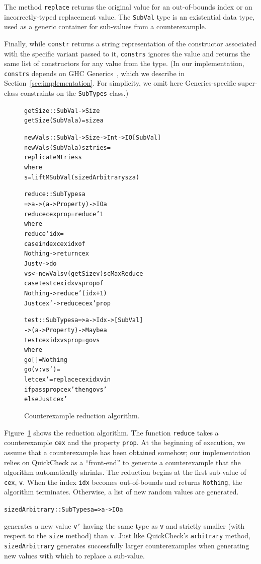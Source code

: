 \documentclass[10pt]{sigplanconf}
\newenvironment{code}{\begin{alltt}}{\end{alltt}}
\newcommand{\ttp}[1]{\texttt{#1}}
\begin{document}
The method \ttp{replace} returns the original value for an out-of-bounds index
or an incorrectly-typed replacement value.  The \ttp{SubVal} type is an
existential data type, used as a generic container for sub-values from a
counterexample.

Finally, while \ttp{constr} returns a string representation of the constructor
associated with the specific variant passed to it, \ttp{constrs} ignores the
value and returns the same list of constructors for any value from the type.
(In our implementation, \ttp{constrs} depends on GHC Generics~\cite{generics},
which we describe in Section~\ref{sec:implementation}.  For simplicity, we omit
here Generics-specific super-class constraints on the \ttp{SubTypes} class.)

\begin{figure}[ht]
  \begin{code}
getSize :: SubVal -> Size
getSize (SubVal a) = size a

newVals :: SubVal -> Size -> Int -> IO [SubVal]
newVals (SubVal a) sz tries =
  replicateM tries s
  where
  s  = liftM SubVal (sizedArbitrary sz a)

reduce :: SubTypes a
       => a -> (a -> Property) -> IO a
reduce cex prop = reduce' 1
  where
  reduce' idx =
    case index cex idx of
      Nothing -> return cex
      Just v  -> do
        vs <- newVals v (getSize v) scMaxReduce
        case test cex idx vs prop of
          Nothing   -> reduce' (idx+1)
          Just cex' -> reduce cex' prop

test :: SubTypes a => a -> Idx -> [SubVal]
     -> (a -> Property) -> Maybe a
test cex idx vs prop = go vs
  where
  go []      = Nothing
  go (v:vs') =
    let cex' = replace cex idx v in
    if pass prop cex' then go vs'
      else Just cex'
  \end{code}
  \caption{Counterexample reduction algorithm.\label{fig:reduction}}
\end{figure}

Figure~\ref{fig:reduction} shows the reduction algorithm.  The function
\ttp{reduce} takes a counterexample \ttp{cex} and the property \ttp{prop}.  At
the beginning of execution, we assume that a counterexample has been obtained
somehow; our implementation relies on QuickCheck as a ``front-end'' to generate
a counterexample that the algorithm automatically shrinks.  The reduction begins
at the first sub-value of \ttp{cex}, \ttp{v}.  When the index \ttp{idx} becomes
out-of-bounds and returns \ttp{Nothing}, the algorithm terminates.  Otherwise, a
list of new random values are generated.
%
\begin{code}
sizedArbitrary :: SubTypes a => a -> IO a
\end{code}
%
\noindent
generates a new value \ttp{v'} having the same type as \ttp{v} and strictly
smaller (with respect to the \ttp{size} method) than \ttp{v}.  Just like
QuickCheck's \ttp{arbitrary} method, \ttp{sizedArbitrary} generates successfully
larger counterexamples when generating new values with which to replace a
sub-value.
\end{document}
